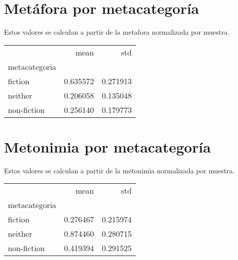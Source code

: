 \documentclass[11pt]{article}
\begin{document}
\section{Metáfora por metacategoría}

Estos valores se calculan a partir de la metafora normalizada por
muestra.

\begin{tabular}{lrr}
\toprule
{} &      mean &       std \\
metacategoria &           &           \\
\midrule
fiction       &  0.635572 &  0.271913 \\
neither       &  0.206058 &  0.135048 \\
non-fiction   &  0.256140 &  0.179773 \\
\bottomrule
\end{tabular}


\section{Metonimia por metacategoría}

Estos valores se calculan a partir de la metonimia normalizada por
muestra.

\begin{tabular}{lrr}
\toprule
{} &      mean &       std \\
metacategoria &           &           \\
\midrule
fiction       &  0.276467 &  0.215974 \\
neither       &  0.874460 &  0.280715 \\
non-fiction   &  0.419394 &  0.291525 \\
\bottomrule
\end{tabular}
\end{document}

